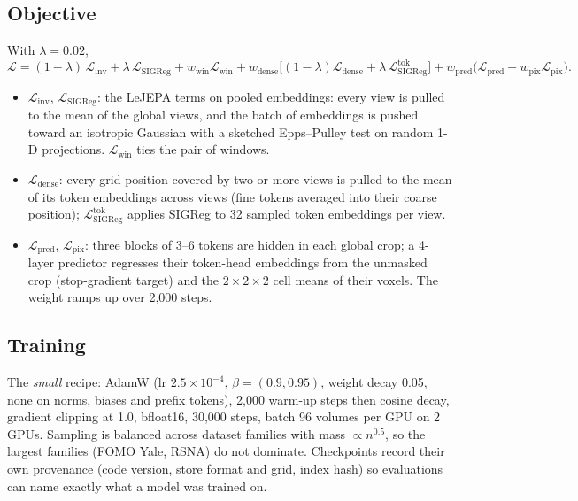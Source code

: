 \documentclass[10pt]{article}
\begin{document}
\subsection{Objective}

With $\lambda=0.02$,
\begin{equation*}
\mathcal{L} = (1-\lambda)\,\mathcal{L}_{\text{inv}} + \lambda\,\mathcal{L}_{\text{SIGReg}} + w_{\text{win}}\mathcal{L}_{\text{win}}
+ w_{\text{dense}}\big[(1-\lambda)\mathcal{L}_{\text{dense}} + \lambda\,\mathcal{L}_{\text{SIGReg}}^{\text{tok}}\big]
+ w_{\text{pred}}\big(\mathcal{L}_{\text{pred}} + w_{\text{pix}}\mathcal{L}_{\text{pix}}\big).
\end{equation*}
\begin{itemize}
  \item $\mathcal{L}_{\text{inv}}$, $\mathcal{L}_{\text{SIGReg}}$: the LeJEPA terms on pooled embeddings: every view is
  pulled to the mean of the global views, and the batch of embeddings is pushed toward an isotropic Gaussian with a
  sketched Epps--Pulley test on random 1-D projections. $\mathcal{L}_{\text{win}}$ ties the pair of windows.
  \item $\mathcal{L}_{\text{dense}}$: every grid position covered by two or more views is pulled to the mean of its
  token embeddings across views (fine tokens averaged into their coarse position);
  $\mathcal{L}_{\text{SIGReg}}^{\text{tok}}$ applies SIGReg to 32 sampled token embeddings per view.
  \item $\mathcal{L}_{\text{pred}}$, $\mathcal{L}_{\text{pix}}$: three blocks of 3--6 tokens are hidden in each global
  crop; a 4-layer predictor regresses their token-head embeddings from the unmasked crop (stop-gradient target) and
  the $2\times2\times2$ cell means of their voxels. The weight ramps up over 2{,}000 steps.
\end{itemize}

\subsection{Training}

The \emph{small} recipe: AdamW (lr $2.5\times10^{-4}$, $\beta=(0.9, 0.95)$, weight decay 0.05, none on norms, biases
and prefix tokens), 2{,}000 warm-up steps then cosine decay, gradient clipping at 1.0, bfloat16, 30{,}000 steps,
batch 96 volumes per GPU on 2 GPUs. Sampling is balanced across dataset families with mass $\propto n^{0.5}$, so the
largest families (FOMO Yale, RSNA) do not dominate. Checkpoints record their own provenance (code version, store
format and grid, index hash) so evaluations can name exactly what a model was trained on.
\end{document}
